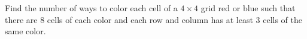 Find the number of ways to color each cell of a $4\times 4$ grid red or blue such that there are $8$ cells of each color and each row and column has at least $3$ cells of the same color.
